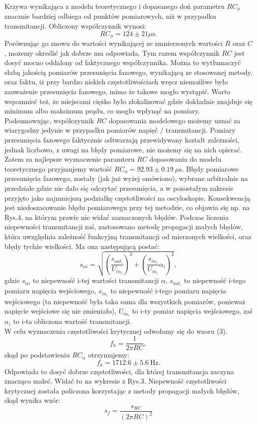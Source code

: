 \documentclass[10pt,a4paper]{article}
\begin{document}
Krzywa wynikająca z modelu teoretycznego i dopasanego doń parametru $RC_{\phi}$ znacznie bardziej odbiega od punktów pomiarowych, niż w przypadku transmitancji.
Obliczony współczynnik wynosi:
$$ RC_{\phi} = 124 \pm 21 \mu \text{s}. $$
Porównując go znowu do wartości wynikającej ze zmnierzonych wartości $R$ oraz $C$, możemy określić jak dobrze mu odpowiada. Tym razem współczynnik $RC$ jest dosyć mocno oddalony od faktycznego współczynnika. Można to wytłumaczyć słabą jakością pomiarów przesunięcia fazowego, wynikającą ze stosowanej metody, oraz faktu, iż przy bardzo niskich częstotliwościach wręcz niemożliwe było zauważenie przesunięcia fazowego, mimo że takowe mogło wystąpić. Warto wspomnieć też, że miejscami ciężko było zlokalizować gdzie dokładnie znajduje się minimum albo maksimum prądu, co mogło wpłynąć na pomiary. \\
Podsumowując, współczynnik $RC$ dopasowania modelowego możemy uznać za wiarygodny jedynie w przypadku pomiarów napięć / transmitancji. Pomiary przesunięcia fazowego faktycznie odtwarzają przewidywany kształt zależności, jednak liczbowo, z uwagi na błędy pomiarowe, nie możemy się na nich opierać.
Zatem za najlepsze wyznaczenie paramteru $RC$ dopasowania do modelu teoretycznego przyjmujemy wartość $RC_{\alpha} = 92.93 \pm 0.19 \ \mu \text{s} $. 
Błędy pomiarowe przesunięcia fazowego, zostały (jak już wyżej omówiono), wybrane arbitralnie na przedziale gdzie nie dało się odczytać przesunięcia, a w pozostałym zakresie przyjęto jako najmniejszą podziałkę częstotliwości na oscyloskopie. Konsekwencją jest niedoszacowanie błędu pomiarowegu przy tej metodzie, co objawia się np. na Rys.4, na którym prawie nie widać zaznaczonych błędów.
Podczas liczenia niepewności transmitancji zaś, zastosowano metodę propagacji małych błędów, która uwzględnia zależność funkcyjną transmitancji od mierzonych wielkości, oraz błędy tychże wielkości. Ma ona następującą postać:
$$ s_{\alpha i} = \sqrt{ (\frac{s_{out_i}}{U_{in_i}})^2 + (\frac{s_{in_i}}{U_{in_i}}\alpha_i)^2 } ,$$
gdzie $s_{\alpha i}$ to niepewność i-tej wartości transmitancji $\alpha$, $s_{out_i}$ to niepewność i-tego pomiaru napięcia wejściowego, 
$s_{in_i}$ to niepewność i-tego pomiaru napięcia wejściowego (ta niepewność była taka sama dla wszystkich pomiarów, ponieważ napięcie wejściowe się nie zmieniało), $U_{in_i}$ to i-ty pomiar napięcia wejściowego, zaś $\alpha_i$ to i-ta obliczona wartość transmitancji. \\
W celu wyznaczenia częstotliwości krytycznej odwołamy się do wzoru (3). 
$$ f_k = \frac{1}{2\pi RC}, $$
skąd po podstawieniu $RC_{\alpha}$ otrzymujemy:
$$ f_k = 1712.6 \pm 5.6 \ \text{Hz}. $$
Odpowiada to dosyć dobrze częstotliwości, dla której transmitancja zaczyna znacząco maleć. Widać to na wykresie z Rys.3.
Niepewność częstotliwości krytycznej została policzona korzystając z metody propagacji małych błędów, skąd wynika wzór:
$$ s_f = \frac{s_{RC}}{(2\pi RC)^2}$$
\end{document}

